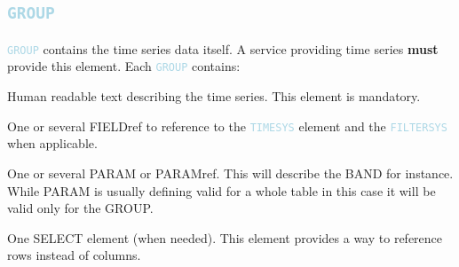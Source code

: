 \documentclass[11pt,a4paper]{ivoa}
\newcommand\elem[1]{\textcolor{LightBlue}{{\tt#1}}}
\begin{document}
\subsection{\elem{GROUP}}
\elem{GROUP} contains the time series data itself. A service providing time series \textbf{must} provide this element. 
Each \elem{GROUP} contains:
\begin{description}
     \item[\elem{DESCRIPTION}] Human readable text describing the time series. This element is mandatory. 
     \item[\elem{FIELDref}] One or several FIELDref to reference to the \elem{TIMESYS} element and the \elem{FILTERSYS} when applicable. 
     \item One or several PARAM or PARAMref. This will describe the BAND for instance. While PARAM is usually defining valid for a whole table in this case it will be valid only for the GROUP.  
     \item One SELECT element (when needed). This element provides a way to reference rows instead of columns. 
\end{description}



\end{document}
